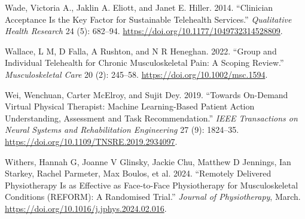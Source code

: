 \documentclass[
  letterpaper,
  DIV=11,
  numbers=noendperiod,
  oneside]{scrartcl}
\newlength{\cslhangindent}
\newenvironment{CSLReferences}[2] %
 {\begin{list}{}{%
  \setlength{\itemindent}{0pt}
  \setlength{\leftmargin}{0pt}
  \setlength{\parsep}{0pt}
  \ifodd #1
   \setlength{\leftmargin}{\cslhangindent}
   \setlength{\itemindent}{-1\cslhangindent}
  \fi
  \setlength{\itemsep}{#2\baselineskip}}}
 {\end{list}}
\begin{document}
\begin{CSLReferences}{1}{0}
Wade, Victoria A., Jaklin A. Eliott, and Janet E. Hiller. 2014.
{``Clinician {Acceptance} Is the {Key Factor} for {Sustainable
Telehealth Services}.''} \emph{Qualitative Health Research} 24 (5):
682--94. \url{https://doi.org/10.1177/1049732314528809}.

Wallace, L M, D Falla, A Rushton, and N R Heneghan. 2022. {``Group and
Individual Telehealth for Chronic Musculoskeletal Pain: {A} Scoping
Review.''} \emph{Musculoskeletal Care} 20 (2): 245--58.
\url{https://doi.org/10.1002/msc.1594}.

Wei, Wenchuan, Carter McElroy, and Sujit Dey. 2019. {``Towards
{On-Demand Virtual Physical Therapist}: {Machine Learning-Based Patient
Action Understanding}, {Assessment} and {Task Recommendation}.''}
\emph{IEEE Transactions on Neural Systems and Rehabilitation
Engineering} 27 (9): 1824--35.
\url{https://doi.org/10.1109/TNSRE.2019.2934097}.

Withers, Hannah G, Joanne V Glinsky, Jackie Chu, Matthew D Jennings, Ian
Starkey, Rachel Parmeter, Max Boulos, et al. 2024. {``Remotely Delivered
Physiotherapy Is as Effective as Face-to-Face Physiotherapy for
Musculoskeletal Conditions ({REFORM}): A Randomised Trial.''}
\emph{Journal of Physiotherapy}, March.
\url{https://doi.org/10.1016/j.jphys.2024.02.016}.

\end{CSLReferences}
\end{document}
